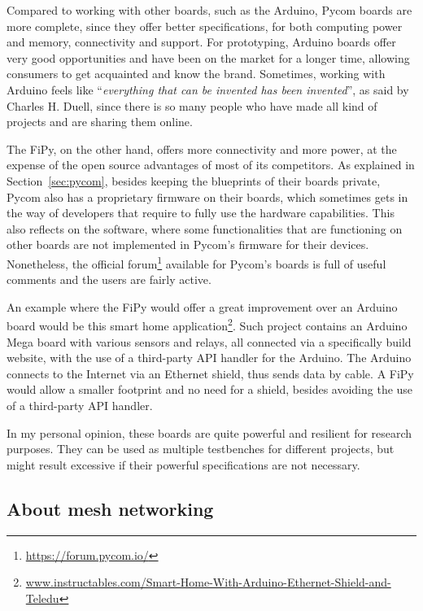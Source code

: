 			Compared to working with other boards, such as the Arduino, Pycom boards are more complete, since they offer better specifications, for both computing power and memory, connectivity and support.			
			For prototyping, Arduino boards offer very good opportunities and have been on the market for a longer time, allowing consumers to get acquainted and know the brand.
			Sometimes, working with Arduino feels like ``\textit{everything that can be invented has been invented}'', as said by Charles H. Duell, since there is so many people who have made all kind of projects and are sharing them online.
			
			The FiPy, on the other hand, offers more connectivity and more power, at the expense of the open source advantages of most of its competitors.
			As explained in Section~\ref{sec:pycom}, besides keeping the blueprints of their boards private, Pycom also has a proprietary firmware on their boards, which sometimes gets in the way of developers that require to fully use the hardware capabilities.
			This also reflects on the software, where some functionalities that are functioning on other boards are not implemented in Pycom's firmware for their devices.
			Nonetheless, the official forum\footnote{ \url{https://forum.pycom.io/}} available for Pycom's boards is full of useful comments and the users are fairly active.
			
			An example where the FiPy would offer a great improvement over an Arduino board would be this smart home application\footnote{ \url{www.instructables.com/Smart-Home-With-Arduino-Ethernet-Shield-and-Teledu}}.
			Such project contains an Arduino Mega board with various sensors and relays, all connected via a specifically build website, with the use of a third-party API handler for the Arduino.
			The Arduino connects to the Internet via an Ethernet shield, thus sends data by cable.
			A FiPy would allow a smaller footprint and no need for a shield, besides avoiding the use of a third-party API handler.
					
			In my personal opinion, these boards are quite powerful and resilient for research purposes.
			They can be used as multiple testbenches for different projects, but might result excessive if their powerful specifications are not necessary.
			
		\subsection{About mesh networking}\label{sec:mesh_considerations}
			
